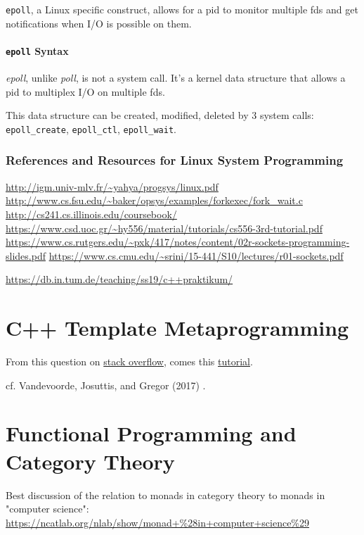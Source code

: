 \documentclass[10pt]{amsart}
\begin{document}
\begin{multicols*}{2}
\texttt{epoll}, a Linux specific construct, allows for a pid to monitor multiple fds and get notifications when I/O is possible on them. 


\subsection{\texttt{epoll} Syntax}

\emph{epoll}, unlike \emph{poll}, is not a system call. It's a kernel data structure that allows a pid to multiplex I/O on multiple fds.

This data structure can be created, modified, deleted by 3 system calls: \texttt{epoll\_create}, \texttt{epoll\_ctl}, \texttt{epoll\_wait}.

\section{References and Resources for Linux System Programming}

\url{http://igm.univ-mlv.fr/~yahya/progsys/linux.pdf} \\
\url{http://www.cs.fsu.edu/~baker/opsys/examples/forkexec/fork_wait.c} \\
\url{http://cs241.cs.illinois.edu/coursebook/}
\url{https://www.csd.uoc.gr/~hy556/material/tutorials/cs556-3rd-tutorial.pdf}
\url{https://www.cs.rutgers.edu/~pxk/417/notes/content/02r-sockets-programming-slides.pdf}
\url{https://www.cs.cmu.edu/~srini/15-441/S10/lectures/r01-sockets.pdf}

\url{https://db.in.tum.de/teaching/ss19/c++praktikum/}


\part{C++ Template Metaprogramming}

From this question on \href{https://stackoverflow.com/questions/112277/best-introduction-to-c-template-metaprogramming}{stack overflow}, comes this \href{http://www.cs.rpi.edu/~musser/design/blitz/meta-art.html}{tutorial}. 

cf. Vandevoorde, Josuttis, and Gregor (2017) \cite{VJG2017}. 

\part{Functional Programming and Category Theory}

Best discussion of the relation to monads in category theory to monads in "computer science": \url{https://ncatlab.org/nlab/show/monad+%28in+computer+science%29}


\end{multicols*}
\end{document}
